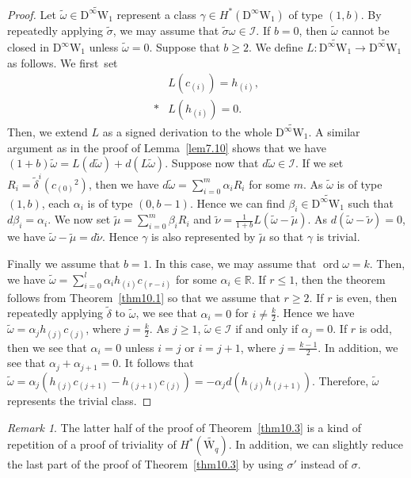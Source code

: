 \documentclass[12pt]{amsart}
\newcommand{\R}{{\mathbb R}}
\newcommand{\W}{\mathrm{W}}
\newcommand{\D}{\mathrm{D}}
\DeclareMathOperator{\ord}{\mathrm{ord}}
\theoremstyle{definition}
\theoremstyle{remark}
\newtheorem{remark}[theorem]{Remark}
\begin{document}
\begin{proof}
Let $\widetilde\omega\in\widetilde{\D^\infty\W_1}$ represent a class $\gamma\in H^*(\D^\infty\W_1)$ of type $(1,b)$.
By repeatedly applying $\widetilde\sigma$, we may assume that $\widetilde\sigma\omega\in\mathscr{I}$.
If $b=0$, then $\widetilde\omega$ cannot be closed in $\D^\infty\W_1$ unless $\widetilde\omega=0$.
Suppose that $b\geq2$.
We define $L\colon\widetilde{\D^\infty\W_1}\to\widetilde{\D^\infty\W_1}$ as follows.
We first~set
\begin{align*}
&L(c_{(i)})=h_{(i)},\\*
&L(h_{(i)})=0.
\end{align*}
Then, we extend $L$ as a signed derivation to the whole $\widetilde{\D^\infty\W_1}$.
A similar argument as in the proof of Lemma~\ref{lem7.10} shows that we have $(1+b)\widetilde\omega=L(d\widetilde\omega)+d(L\widetilde\omega)$.
Suppose now that $d\widetilde\omega\in\mathscr{I}$.
If we set $R_i=\widetilde{\delta}^i(c_{(0)}{}^2)$, then we have $d\widetilde\omega=\sum_{i=0}^m\alpha_iR_i$ for some $m$.
As $\widetilde\omega$ is of type $(1,b)$, each $\alpha_i$ is of type $(0,b-1)$.
Hence we can find $\beta_i\in\widetilde{\D^\infty\W_1}$ such that $d\beta_i=\alpha_i$.
We now set $\widetilde\mu=\sum_{i=0}^m\beta_iR_i$ and $\widetilde\nu=\frac1{1+b}L(\widetilde\omega-\widetilde\mu)$.
As $d(\widetilde\omega-\widetilde\nu)=0$, we have $\widetilde\omega-\widetilde\mu=d\widetilde\nu$.
Hence $\gamma$ is also represented by $\widetilde\mu$ so that $\gamma$ is trivial.

Finally we assume that $b=1$.
In this case, we may assume that $\ord\omega=k$.
Then, we have $\widetilde\omega=\sum_{i=0}^l\alpha_ih_{(i)}c_{(r-i)}$ for some $\alpha_i\in\R$.
If $r\leq1$, then the theorem follows from Theorem~\ref{thm10.1} so that we assume that $r\geq2$.
If $r$ is even, then repeatedly applying $\widetilde\delta$ to $\widetilde\omega$, we see that $\alpha_i=0$ for $i\neq\frac{k}2$.
Hence we have $\widetilde\omega=\alpha_jh_{(j)}c_{(j)}$, where $j=\frac{k}2$.
As $j\geq1$, $\widetilde\omega\in\mathscr{I}$ if and only if $\alpha_j=0$.
If $r$ is odd, then we see that $\alpha_i=0$ unless $i=j$ or $i=j+1$, where $j=\frac{k-1}2$.
In addition, we see that $\alpha_j+\alpha_{j+1}=0$.
It follows that $\widetilde\omega=\alpha_j(h_{(j)}c_{(j+1)}-h_{(j+1)}c_{(j)})=-\alpha_jd(h_{(j)}h_{(j+1)})$.
Therefore, $\widetilde\omega$ represents the trivial class.
\end{proof}

\begin{remark}
The latter half of the proof of Theorem~\ref{thm10.3} is a kind of repetition of a proof of triviality of $H^*(\widetilde{\W_q})$.
In addition, we can slightly reduce the last part of the proof of Theorem~\ref{thm10.3} by using $\sigma'$ instead of $\sigma$.
\end{remark}
\end{document}

